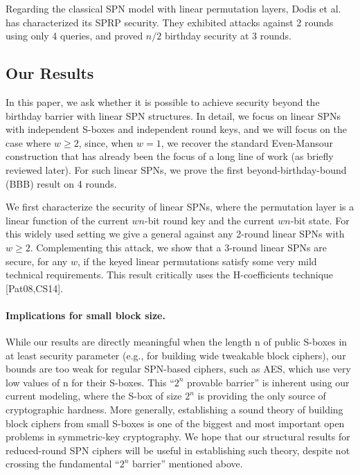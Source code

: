 Regarding the classical SPN model with linear permutation layers, Dodis et al. has characterized its SPRP security.
They exhibited attacks against 2 rounds using only 4 queries, and proved $n/2$ birthday security at 3 rounds.





\subsection{Our Results}


In this paper, we ask whether it is possible to achieve security beyond the birthday barrier with linear SPN structures. In detail, we focus on linear SPNs with independent S-boxes and independent round keys, and we will focus on the case where $w\geq2$, since, when $w = 1$, we recover the standard Even-Mansour construction that has already been the focus
of a long line of work (as briefly reviewed later). For such linear SPNs, we prove the first beyond-birthday-bound (BBB) result on 4 rounds.





We first characterize the security of linear SPNs, where the
permutation layer is a linear function of the current $wn$-bit round key and the current $wn$-bit state. For this widely used setting we give a
general against any 2-round linear SPNs with $w\geq2$. Complementing this
attack, we show that a 3-round linear SPNs are secure, for any $w$, if the keyed linear permutations satisfy some very mild technical requirements. This result critically uses the H-coefficients technique [Pat08,CS14].





\paragraph{Implications for small block size.}

While our results are directly meaningful
when the length n of public S-boxes in at least security parameter (e.g., for
building wide tweakable block ciphers), our bounds are too weak for regular SPN-based
ciphers, such as AES, which use very low values of n for their S-boxes.
This ``$2^n$ provable barrier'' is inherent using our current modeling, where the
S-box of size $2^n$ is providing the only source of cryptographic hardness. More
generally, establishing a sound theory of building block ciphers from small S-boxes is one of the biggest and most important open problems in symmetric-key
cryptography. We hope that our structural results for reduced-round SPN ciphers will be useful in establishing such theory, despite not crossing the fundamental ``$2^n$ barrier'' mentioned above.



